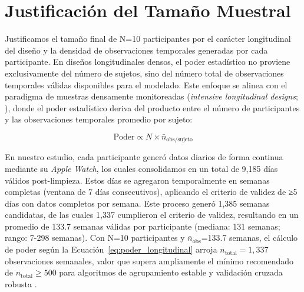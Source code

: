 \section{Justificación del Tamaño Muestral}
\label{sec:justificacion_n}

Justificamos el tamaño final de N=10 participantes por el carácter longitudinal del diseño y la densidad de observaciones temporales generadas por cada participante. En diseños longitudinales densos, el poder estadístico no proviene exclusivamente del número de sujetos, sino del número total de observaciones temporales válidas disponibles para el modelado. Este enfoque se alinea con el paradigma de muestras densamente monitoreadas (\textit{intensive longitudinal designs}; \cite{Bolger2013}), donde el poder estadístico deriva del producto entre el número de participantes y las observaciones temporales promedio por sujeto:

\begin{equation}
\text{Poder} \propto N \times \bar{n}_{\text{obs/sujeto}}
\label{eq:poder_longitudinal}
\end{equation}

En nuestro estudio, cada participante generó datos diarios de forma continua mediante su \textit{Apple Watch}, los cuales consolidamos en un total de 9,185 días válidos post-limpieza. Estos días se agregaron temporalmente en semanas completas (ventana de 7 días consecutivos), aplicando el criterio de validez de ≥5 días con datos completos por semana. Este proceso generó 1,385 semanas candidatas, de las cuales 1,337 cumplieron el criterio de validez, resultando en un promedio de 133.7 semanas válidas por participante (mediana: 131 semanas; rango: 7-298 semanas). Con N=10 participantes y $\bar{n}_{\text{obs}}$=133.7 semanas, el cálculo de poder según la Ecuación~\ref{eq:poder_longitudinal} arroja $n_{\text{total}}=1{,}337$ observaciones semanales, valor que supera ampliamente el mínimo recomendado de $n_{\text{total}} \geq 500$ para algoritmos de agrupamiento estable y validación cruzada robusta \cite{Alinia2020}.

